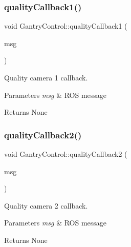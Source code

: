 \subsubsection{\texorpdfstring{quality\+Callback1()}{qualityCallback1()}}
{\footnotesize\ttfamily void Gantry\+Control\+::quality\+Callback1 (\begin{DoxyParamCaption}\item[{const nist\+\_\+gear\+::\+Logical\+Camera\+Image \&}]{msg }\end{DoxyParamCaption})}



Quality camera 1 callback. 


\begin{DoxyParams}{Parameters}
{\em msg} & R\+OS message \\
\hline
\end{DoxyParams}
\begin{DoxyReturn}{Returns}
None 
\end{DoxyReturn}
\mbox{\label{classGantryControl_a355b299969bfa74073062ba1c6c1ec04}} 
\subsubsection{\texorpdfstring{quality\+Callback2()}{qualityCallback2()}}
{\footnotesize\ttfamily void Gantry\+Control\+::quality\+Callback2 (\begin{DoxyParamCaption}\item[{const nist\+\_\+gear\+::\+Logical\+Camera\+Image \&}]{msg }\end{DoxyParamCaption})}



Quality camera 2 callback. 


\begin{DoxyParams}{Parameters}
{\em msg} & R\+OS message \\
\hline
\end{DoxyParams}
\begin{DoxyReturn}{Returns}
None 
\end{DoxyReturn}
\mbox{\label{classGantryControl_ad7a304b37a95f29634631d4183276be3}} 
